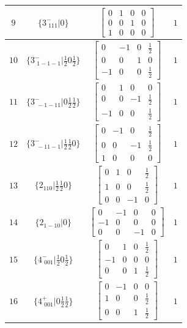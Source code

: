 \documentclass[fleqn,8pt]{jsarticle}
\begin{document}
\begin{longtable}{cccc}
$ 9 $ & $ \{3^{-}_{\,\,111}|0\} $ & $ \begin{bmatrix} 0 & 1 & 0 & 0 \\ 0 & 0 & 1 & 0 \\ 1 & 0 & 0 & 0 \end{bmatrix} $ & $ 1 $ \\ \hline
$ 10 $ & $ \{3^{-}_{\,\,1-1-1}|\frac{1}{2} 0 \frac{1}{2}\} $ & $ \begin{bmatrix} 0 & -1 & 0 & \frac{1}{2} \\ 0 & 0 & 1 & 0 \\ -1 & 0 & 0 & \frac{1}{2} \end{bmatrix} $ & $ 1 $ \\ \hline
$ 11 $ & $ \{3^{-}_{\,\,-1-11}|0 \frac{1}{2} \frac{1}{2}\} $ & $ \begin{bmatrix} 0 & 1 & 0 & 0 \\ 0 & 0 & -1 & \frac{1}{2} \\ -1 & 0 & 0 & \frac{1}{2} \end{bmatrix} $ & $ 1 $ \\ \hline
$ 12 $ & $ \{3^{-}_{\,\,-11-1}|\frac{1}{2} \frac{1}{2} 0\} $ & $ \begin{bmatrix} 0 & -1 & 0 & \frac{1}{2} \\ 0 & 0 & -1 & \frac{1}{2} \\ 1 & 0 & 0 & 0 \end{bmatrix} $ & $ 1 $ \\ \hline
$ 13 $ & $ \{2{}_{110}|\frac{1}{2} \frac{1}{2} 0\} $ & $ \begin{bmatrix} 0 & 1 & 0 & \frac{1}{2} \\ 1 & 0 & 0 & \frac{1}{2} \\ 0 & 0 & -1 & 0 \end{bmatrix} $ & $ 1 $ \\ \hline
$ 14 $ & $ \{2{}_{1-10}|0\} $ & $ \begin{bmatrix} 0 & -1 & 0 & 0 \\ -1 & 0 & 0 & 0 \\ 0 & 0 & -1 & 0 \end{bmatrix} $ & $ 1 $ \\ \hline
$ 15 $ & $ \{4^{-}_{\,\,001}|\frac{1}{2} 0 \frac{1}{2}\} $ & $ \begin{bmatrix} 0 & 1 & 0 & \frac{1}{2} \\ -1 & 0 & 0 & 0 \\ 0 & 0 & 1 & \frac{1}{2} \end{bmatrix} $ & $ 1 $ \\ \hline
$ 16 $ & $ \{4^{+}_{\,\,001}|0 \frac{1}{2} \frac{1}{2}\} $ & $ \begin{bmatrix} 0 & -1 & 0 & 0 \\ 1 & 0 & 0 & \frac{1}{2} \\ 0 & 0 & 1 & \frac{1}{2} \end{bmatrix} $ & $ 1 $ \\ \hline

\end{longtable}
\end{document}
